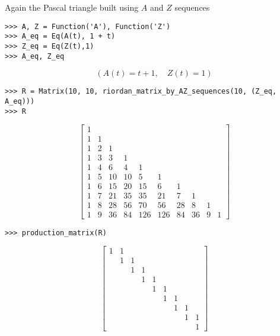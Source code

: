 \begin{example}
Again the Pascal triangle built using $A$ and $Z$ sequences
\begin{verbatim}
>>> A, Z = Function('A'), Function('Z')
>>> A_eq = Eq(A(t), 1 + t)
>>> Z_eq = Eq(Z(t),1)
>>> A_eq, Z_eq
\end{verbatim}
\begin{displaymath}
\left ( A{\left (t \right )} = t + 1, \quad Z{\left (t \right )} = 1\right )
\end{displaymath}
\begin{verbatim}
>>> R = Matrix(10, 10, riordan_matrix_by_AZ_sequences(10, (Z_eq, A_eq)))
>>> R
\end{verbatim}
\begin{displaymath}
\left[\begin{matrix}1 &   &   &   &   &   &   &   &   &  \\1 & 1 &   &   &   &   &   &   &   &  \\1 & 2 & 1 &   &   &   &   &   &   &  \\1 & 3 & 3 & 1 &   &   &   &   &   &  \\1 & 4 & 6 & 4 & 1 &   &   &   &   &  \\1 & 5 & 10 & 10 & 5 & 1 &   &   &   &  \\1 & 6 & 15 & 20 & 15 & 6 & 1 &   &   &  \\1 & 7 & 21 & 35 & 35 & 21 & 7 & 1 &   &  \\1 & 8 & 28 & 56 & 70 & 56 & 28 & 8 & 1 &  \\1 & 9 & 36 & 84 & 126 & 126 & 84 & 36 & 9 & 1\end{matrix}\right]
\end{displaymath}
\begin{verbatim}
>>> production_matrix(R)
\end{verbatim}
\begin{displaymath}
\left[\begin{matrix}1 & 1 &   &   &   &   &   &   &  \\  & 1 & 1 &   &   &   &   &   &  \\  &   & 1 & 1 &   &   &   &   &  \\  &   &   & 1 & 1 &   &   &   &  \\  &   &   &   & 1 & 1 &   &   &  \\  &   &   &   &   & 1 & 1 &   &  \\  &   &   &   &   &   & 1 & 1 &  \\  &   &   &   &   &   &   & 1 & 1\\  &   &   &   &   &   &   &   & 1\end{matrix}\right]
\end{displaymath}
\end{example}


